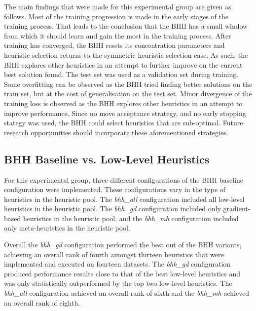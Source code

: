 The main findings that were made for this experimental group are given as follows. Most of the training progression is made in the early stages of the training process. That leads to the conclusion that the \acs{BHH} has a small window from which it should learn and gain the most in the training process. After training has converged, the \acs{BHH} resets its concentration parameters and heuristic selection returns to the symmetric heuristic selection case. As such, the \acs{BHH} explores other heuristics in an attempt to further improve on the current best solution found. The test set was used as a validation set during training. Some overfitting can be observed as the \acs{BHH} tried finding better solutions on the train set, but at the cost of generalisation on the test set. Minor divergence of the training loss is observed as the \acs{BHH} explores other heuristics in an attempt to improve performance. Since no move acceptance strategy, and no early stopping stategy was used, the \acs{BHH} could select heuristics that are sub-optimal. Future research opportunities should incorporate these aforementioned strategies.


\subsection{\acs{BHH} Baseline vs. Low-Level Heuristics}
\label{sec:conclusion:results:summary:standalone}

For this experimental group, three different configurations of the \acs{BHH} baseline configuration were implemented. These configurations vary in the type of heuristics in the heuristic pool. The \textit{bhh\_all} configuration included all low-level heuristics in the heuristic pool. The \textit{bhh\_gd} configuration included only gradient-based heuristics in the heuristic pool, and the \textit{bhh\_mh} configuration included only meta-heuristics in the heuristic pool.

Overall the \textit{bhh\_gd} configuration performed the best out of the \acs{BHH} variants, achieving an overall rank of fourth amongst thirteen heuristics that were implemented and executed on fourteen datasets. The \textit{bhh\_gd} configuration produced performance results close to that of the best low-level heuristics and was only statistically outperformed by the top two low-level heuristics. The \textit{bhh\_all} configuration achieved an overall rank of sixth and the \textit{bhh\_mh} achieved an overall rank of eighth.


